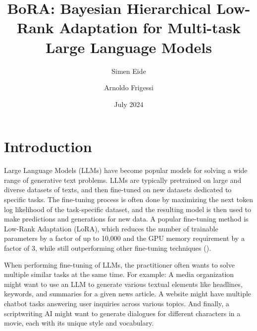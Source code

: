 \documentclass[fullpaper]{nldl}
\title{BoRA: Bayesian Hierarchical Low-Rank Adaptation for Multi-task Large Language Models}
\author[1]{Simen Eide}
\author[2]{Arnoldo Frigessi}
\affil[1]{University of Oslo, Schibsted}
\affil[2]{University of Oslo}
\date{July 2024}
\begin{document}
\maketitle
{}

\section{Introduction}
Large Language Models (LLMs) have become popular models for solving a wide range of generative text problems. LLMs are typically pretrained on large and diverse datasets of texts, and then fine-tuned on new datasets dedicated to specific tasks. The fine-tuning process is often done by maximizing the next token log likelihood of the task-specific dataset, and the resulting model is then used to make predictions and generations for new data. A popular fine-tuning method is Low-Rank Adaptation (LoRA), which reduces the number of trainable parameters by a factor of up to 10,000 and the GPU memory requirement by a factor of 3, while still outperforming other fine-tuning techniques (\cite{hu_lora_2022}).

When performing fine-tuning of LLMs, the practitioner often wants to solve multiple similar tasks at the same time. For example:
A media organization might want to use an LLM to generate various textual elements like headlines, keywords, and summaries for a given news article. 
A website might have multiple chatbot tasks answering user inquiries across various topics.
And finally, a scriptwriting AI might want to generate dialogues for different characters in a movie, each with its unique style and vocabulary.
\end{document}
